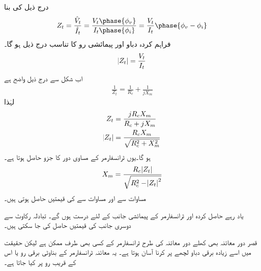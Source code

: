 درج ذیل کی بنا
\begin{align*}
Z_t=\frac{\hat{V}_t}{\hat{I}_t}=\frac{V_t\phase{\phi_v}}{I_t\phase{\phi_i}}=\frac{V_t}{I_t}\phase{\phi_v-\phi_i}
\end{align*}
فراہم کردہ دباو اور پیمائشی رو کا تناسب درج ذیل ہو گا۔
\begin{align*}
\abs{Z_t}=\frac{V_t}{I_t}
\end{align*}
اب شکل   سے درج ذیل  واضح ہے
\begin{align*}
\frac{1}{Z_t}=\frac{1}{R_c}+\frac{1}{j X_m}
\end{align*}
لہٰذا
\begin{align*}
Z_t&=\frac{j R_c X_m}{R_c+j X_m}\\
\abs{Z_t}&=\frac{R_c X_m}{\sqrt{R_c^2+X_m^2}}
\end{align*}
ہو گا۔یوں ٹرانسفارمر کے مساوی دور کا جزو  حاصل ہوتا ہے۔
\begin{align}\label{مساوات_ٹرانسفارمر_کھلے_دور_امالہ_حاصل}
X_m=\frac{R_c \abs{Z_t}}{\sqrt{R_c^2-\abs{Z_t}^2}}
\end{align}
مساوات   سے  اور  مساوات   سے    کی قیمتیں حاصل ہوتی ہیں۔

یاد رہے حاصل کردہ  اور  ٹرانسفارمر کے پیمائشی جانب کے لئے درست ہوں گے۔ تبادلہ رکاوٹ سے دوسری جانب کی قیمتیں حاصل کی جا سکتی ہیں۔ 

قصر دور معائنہ بھی کھلے دور معائنہ کی طرح ٹرانسفارمر کے کسی بھی طرف ممکن  ہے لیکن حقیقت میں اسے زیادہ برقی دباو لچھے پر کرنا  آسان ہوتا ہے۔ یہ معائنہ  ٹرانسفارمر کے بناوٹی برقی رو  یا اس کے قریب رو پر کیا جاتا ہے۔

